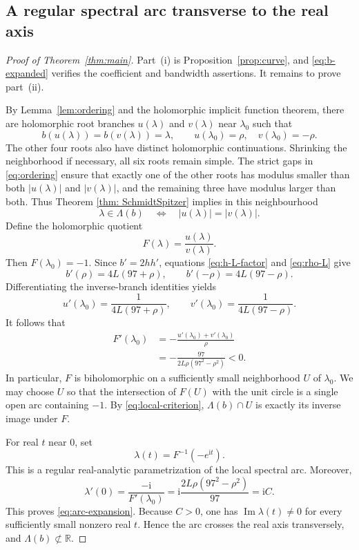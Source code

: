 \documentclass[11pt,a4paper]{amsart}
\theoremstyle{remark}
\numberwithin{equation}{section}
\newcommand{\R}{\mathbb R}
\newcommand{\ii}{\mathrm i}
\DeclareMathOperator{\Ima}{Im}
\begin{document}
\subsection{A regular spectral arc transverse to the real axis}

\begin{proof}[Proof of Theorem~\ref{thm:main}]
Part~\textup{(i)} is Proposition~\ref{prop:curve}, and \eqref{eq:b-expanded} verifies the coefficient and bandwidth assertions. It remains to prove part~\textup{(ii)}.

By Lemma~\ref{lem:ordering} and the holomorphic implicit function theorem, there are holomorphic root branches \(u(\lambda)\) and \(v(\lambda)\) near \(\lambda_0\) such that
\[
 b(u(\lambda))=b(v(\lambda))=\lambda,
 \qquad u(\lambda_0)=\rho,\quad v(\lambda_0)=-\rho.
\]
The other four roots also have distinct holomorphic continuations. Shrinking the neighborhood if necessary, all six roots remain simple. The strict gaps in \eqref{eq:ordering} ensure that exactly one of the other roots has modulus smaller than both \(|u(\lambda)|\) and \(|v(\lambda)|\), and the remaining three have modulus larger than both. Thus Theorem \ref{thm: SchmidtSpitzer} implies in this neighbourhood
\begin{equation}
 \lambda\in\Lambda(b)
 \quad\Longleftrightarrow\quad |u(\lambda)|=|v(\lambda)|.
 \label{eq:local-criterion}
\end{equation}
Define the holomorphic quotient
\[
 F(\lambda)=\frac{u(\lambda)}{v(\lambda)}.
\]
Then \(F(\lambda_0)=-1\). Since \(b'=2hh'\), equations \eqref{eq:h-L-factor} and \eqref{eq:rho-L} give
\[
 b'(\rho)=4L(97+\rho),\qquad
 b'(-\rho)=4L(97-\rho).
\]
Differentiating the inverse-branch identities yields
\[
 u'(\lambda_0)=\frac{1}{4L(97+\rho)},\qquad
 v'(\lambda_0)=\frac{1}{4L(97-\rho)}.
\]
It follows that
\begin{equation}
 \begin{split}
 F'(\lambda_0)
  &=-\frac{u'(\lambda_0)+v'(\lambda_0)}{\rho}\\
  &=-\frac{97}{2L\rho(97^2-\rho^2)}<0.
 \end{split}
 \label{eq:F-prime}
\end{equation}
In particular, \(F\) is biholomorphic on a sufficiently small neighborhood \(U\) of \(\lambda_0\). We may choose \(U\) so that the intersection of \(F(U)\) with the unit circle is a single open arc containing \(-1\). By \eqref{eq:local-criterion}, \(\Lambda(b)\cap U\) is exactly its inverse image under \(F\).

For real \(t\) near \(0\), set
\begin{equation}
 \lambda(t)=F^{-1}(-e^{\ii t}).
 \label{eq:arc-param}
\end{equation}
This is a regular real-analytic parametrization of the local spectral arc. Moreover,
\[
 \lambda'(0)=\frac{-\ii}{F'(\lambda_0)}
            =\ii\frac{2L\rho(97^2-\rho^2)}{97}=\ii C.
\]
This proves \eqref{eq:arc-expansion}. Because \(C>0\), one has \(\Ima\lambda(t)\neq0\) for every sufficiently small nonzero real \(t\). Hence the arc crosses the real axis transversely, and \(\Lambda(b)\not\subset\R\).
\end{proof}
\end{document}
